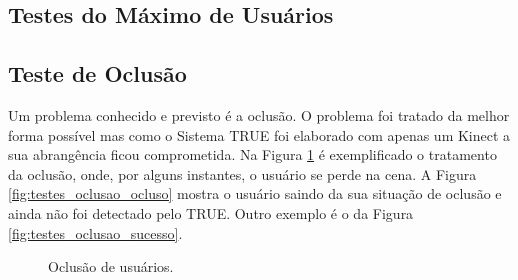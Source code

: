 	\subsection{Testes do Máximo de Usuários}
	
	
	\subsection{Teste de Oclusão}
	
		Um problema conhecido e previsto é a oclusão. O problema foi tratado da melhor
		forma possível mas como o Sistema TRUE foi elaborado com apenas um Kinect a
		sua abrangência ficou comprometida. Na Figura \ref{fig:testes_oclusao}
		é exemplificado o tratamento da oclusão, onde, por alguns instantes, o usuário
		se perde na cena. A Figura \ref{fig:testes_oclusao_ocluso} mostra o usuário
		saindo da sua situação de oclusão e ainda não foi detectado pelo TRUE. Outro
		exemplo é o da Figura \ref{fig:testes_oclusao_sucesso}.
	
		\begin{figure}[H]
		\begin{center}
			\end{center}
			\caption{Oclusão de usuários.}
			\label{fig:testes_oclusao}
		\end{figure}
		
